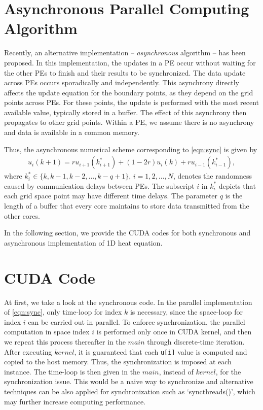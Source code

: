 \documentclass[1p]{elsarticle}
\begin{document}
\section{Asynchronous Parallel Computing Algorithm}
Recently, an alternative implementation -- \textit{asynchronous} algorithm -- has been proposed. In this implementation, the updates in a PE occur without waiting for the other PEs to finish and their results to be synchronized. The data update across PEs occurs sporadically and independently. This asynchrony directly affects the update equation for the boundary points, as they depend on the grid points across PEs. For these points, the update is performed with the most recent available value, typically stored in a buffer. The effect of this asynchrony then propagates to other grid points. Within a PE, we assume there is no asynchrony and data is available in a common memory. 

Thus, the asynchronous numerical scheme corresponding to \eqref{eqn:sync} is given by
\begin{align}
u_{i}(k+1) = ru_{i+1}(k^{*}_{i+1}) + (1-2r)u_{i}(k) + ru_{i-1}(k^{*}_{i-1}),\label{eqn:async}
\end{align}
where $k^{*}_{i}\in \{k,k-1,k-2,\hdots,k-q+1\}$, $i=1,2,\hdots,N$, denotes the randomness caused by communication delays between PEs. The subscript $i$ in $k_i^*$ depicts that each grid space point may have different time delays.
The parameter $q$ is the length of a buffer that every core maintains to store data transmitted from the other cores. 

In the following section, we provide the \textsf{CUDA} codes for both synchronous and asynchronous implementation of 1D heat equation.

\section{\textsf{CUDA} Code}


At first, we take a look at the synchronous code. In the parallel implementation of \eqref{eqn:sync}, only time-loop for index $k$ is necessary, since the space-loop for index $i$ can be carried out in parallel. To enforce synchronization, the parallel computation in space index $i$ is performed only once in \textsf{CUDA} kernel, and then we repeat this process thereafter in the $main$ through discrete-time iteration. After executing $kernel$, it is guaranteed that each \texttt{u[i]} value is computed and copied to the host memory. Thus, the synchronization is imposed at each instance. The time-loop is then given in the $main$, instead of $kernel$, for the synchronization issue. This would be a naive way to synchronize and alternative techniques can be also applied for synchronization such as `\textsf{\underbar{  }\underbar{ }syncthreads()}', which may further increase computing performance. 
\end{document}
